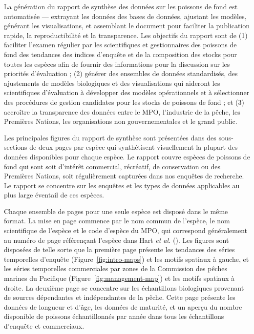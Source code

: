\documentclass[12pt]{article}\usepackage[]{graphicx}\usepackage[]{color}
\begin{document}
La génération du rapport de synthèse des données sur les poissons de fond est automatisée --- extrayant les données des bases de données, ajustant les modèles, générant les visualisations, et assemblant le document pour faciliter la publication rapide, la reproductibilité et la transparence. Les objectifs du rapport sont de (1) faciliter l'examen régulier par les scientifiques et gestionnaires des poissons de fond des tendances des indices d'enquête et de la composition des stocks pour toutes les espèces afin de fournir des informations pour la discussion sur les priorités d'évaluation ; (2) générer des ensembles de données standardisés, des ajustements de modèles biologiques et des visualisations qui aideront les scientifiques d'évaluation à développer des modèles opérationnels et à sélectionner des procédures de gestion candidates pour les stocks de poissons de fond ; et (3) accroître la transparence des données entre le MPO, l'industrie de la pêche, les Premières Nations, les organisations non gouvernementales et le grand public.

Les principales figures du rapport de synthèse sont présentées dans des sous-sections de deux pages par espèce qui synthétisent visuellement la plupart des données disponibles pour chaque espèce. Le rapport couvre  espèces de poissons de fond qui sont soit d'intérêt commercial, récréatif, de conservation ou des Premières Nations, soit régulièrement capturées dans nos enquêtes de recherche. Le rapport se concentre sur les enquêtes et les types de données applicables au plus large éventail de ces espèces.

Chaque ensemble de pages pour une seule espèce est disposé dans le même format. La mise en page commence par le nom commun de l'espèce, le nom scientifique de l'espèce et le code d'espèce du MPO, qui correspond généralement au numéro de page référençant l'espèce dans Hart \emph{et al.} (). Les figures sont disposées de telle sorte que la première page présente les tendances des séries temporelles d'enquête (Figure~\ref{fig:intro-maps}) et les motifs spatiaux à gauche, et les séries temporelles commerciales par zones de la Commission des pêches marines du Pacifique (Figure~\ref{fig:management-map}) et les motifs spatiaux à droite. La deuxième page se concentre sur les échantillons biologiques provenant de sources dépendantes et indépendantes de la pêche. Cette page présente les données de longueur et d'âge, les données de maturité, et un aperçu du nombre disponible de poissons échantillonnés par année dans tous les échantillons d'enquête et commerciaux.
\end{document}

